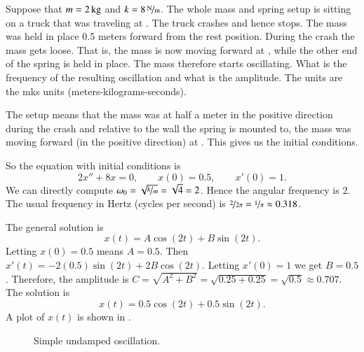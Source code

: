 \documentclass[12pt]{book}
\begin{document}
\begin{example}
Suppose that $m=\unit[2]{kg}$ and $k=\unitfrac[8]{N}{m}$.
The whole mass and spring setup is sitting on
a truck that was traveling at .
The truck crashes and hence stops.
The mass was held in place 0.5 meters forward from the rest position.  During
the crash the mass gets loose.  That is, the mass is now 
moving forward at , while the other end of the
spring is held
in place.  The mass therefore starts oscillating.
What is the frequency of the resulting oscillation and what is the amplitude.
The units are the mks units (meters-kilograms-seconds).

The setup means that the mass was at half a meter in the positive
direction during the crash and
relative to the wall the spring is mounted to, the mass was moving forward
(in the positive direction) at .  This gives us the initial
conditions.

So the equation with initial conditions is
\begin{equation*}
2 x'' + 8 x = 0 , \qquad x(0) = 0.5, \qquad x'(0) = 1.
\end{equation*}
We can directly compute $\omega_0 = \sqrt{\nicefrac{k}{m}} = \sqrt{4} = 2$.
Hence the angular frequency is 2.  The usual frequency in Hertz (cycles per
second) is $\nicefrac{2}{2\pi} = \nicefrac{1}{\pi} \approx 0.318$.

The general solution is
\begin{equation*}
x(t) = A \cos (2t) + B \sin (2t) .
\end{equation*}
Letting $x(0) = 0.5$ means $A = 0.5$.  Then $x'(t) = - 2(0.5) \sin (2t)
+ 2B \cos (2t)$.
Letting $x'(0) = 1$ we get $B = 0.5$.  Therefore, the amplitude is
$C = \sqrt{A^2+B^2} = \sqrt{0.25+0.25} = \sqrt{0.5} \approx 0.707$.  The solution is
\begin{equation*}
x(t) = 0.5 \cos (2t) + 0.5 \sin (2t) .
\end{equation*}
A plot of $x(t)$ is shown in .

\begin{figure}[h!t]
\capstart
\begin{center}
\caption{Simple undamped oscillation.\label{mv:undampedfig}}
\end{center}
\end{figure}
\end{example}
\end{document}

